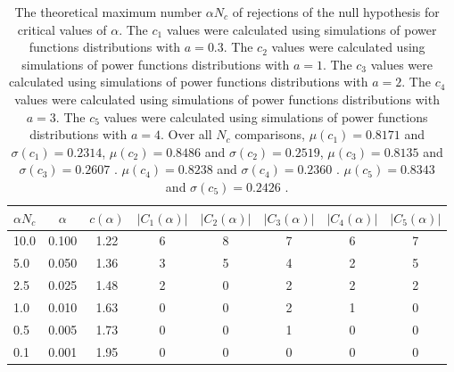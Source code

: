 \begin{table}[h!]
\begin{center}
\begin{tabular}{| l | c | c | c | c | c | c | c |}\hline
$\alpha N_c$ & $\alpha$ & $c(\alpha)$ & $|C_1(\alpha)|$ & $|C_2(\alpha)|$ & $|C_3(\alpha)|$ & $|C_4(\alpha)|$ & $|C_5(\alpha)|$ \\\hline\hline
10.0 & 0.100 & 1.22 & 6 & 8 & 7 & 6 & 7 \\\hline
5.0 & 0.050 & 1.36 & 3 & 5 & 4 & 2 & 5 \\\hline
2.5 & 0.025 & 1.48 & 2 & 0 & 2 & 2 & 2 \\\hline
1.0 & 0.010 & 1.63 & 0 & 0 & 2 & 1 & 0 \\\hline
0.5 & 0.005 & 1.73 & 0 & 0 & 1 & 0 & 0 \\\hline
0.1 & 0.001 & 1.95 & 0 & 0 & 0 & 0 & 0 \\\hline
\end{tabular}
\caption{The theoretical maximum number $\alpha N_c$ of rejections
of the null hypothesis for critical values of $\alpha$.
The $c_1$ values were calculated using simulations of power functions distributions with $a=0.3$.
The $c_2$ values were calculated using simulations of power functions distributions with $a=1$.
The $c_3$ values were calculated using simulations of power functions distributions with $a=2$.
The $c_4$ values were calculated using simulations of power functions distributions with $a=3$.
The $c_5$ values were calculated using simulations of power functions distributions with $a=4$.
Over all $N_c$ comparisons,
 $\mu(c_1)=0.8171$ and $\sigma(c_1)=0.2314$,
 $\mu(c_2)=0.8486$ and $\sigma(c_2)=0.2519$,
 $\mu(c_3)=0.8135$ and $\sigma(c_3)=0.2607$ .
 $\mu(c_4)=0.8238$ and $\sigma(c_4)=0.2360$ .
 $\mu(c_5)=0.8343$ and $\sigma(c_5)=0.2426$ .
}
\end{center}
\end{table}